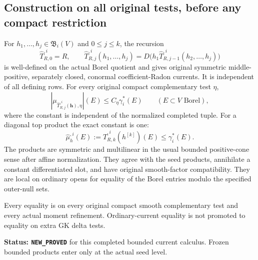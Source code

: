 \subsection{Construction on all original tests, before any compact restriction}

\begin{theorem}
\label{thm:r12-completed-band-products}
For $h_1,\ldots,h_j\in\mathfrak B_i(V)$ and $0\leq j\leq k$,
the recursion
\[
 \widehat T^{,i}_{R,0}=R,\qquad
 \widehat T^{,i}_{R,j}(h_1,\ldots,h_j)
    =D\bigl(h_1\widehat T^{,i}_{R,j-1}(h_2,\ldots,h_j)\bigr)
 \tag{BC4}
\]
is well-defined on the actual Borel quotient and gives original
symmetric middle-positive, separately closed, conormal
coefficient-Radon currents. It is independent of all defining
rows. For every original compact complementary test $\eta$,
\[
 \left|\mu_{\widehat T^{,i}_{R,j}(\mathbf h),\eta}\right|(E)
                \leq C_\eta\gamma_i^*(E)
                         \qquad(E\subset V\text{ Borel}),
 \tag{BC5}
\]
where the constant is independent of the normalized completed
tuple. For a diagonal top product the exact constant is one:
\[
       \widehat\mu^{,i}_h(E)
           :=\widehat T^{,i}_{R,k}(h^{[k]})(E)
                          \leq\gamma_i^*(E).
 \tag{BC6}
\]
The products are symmetric and multilinear in the usual bounded
positive-cone sense after affine normalization. They agree with
the seed products, annihilate a constant differentiated slot,
and have original smooth-factor compatibility. They are local
on ordinary opens for equality of the Borel entries modulo the
specified outer-null sets.

Every equality is on every original compact smooth complementary
test and every actual moment refinement. Ordinary-current
equality is not promoted to equality on extra GK delta tests.
\end{theorem}

\noindent\textbf{Status: \texttt{NEW\_PROVED}} for this completed
bounded current calculus. Frozen bounded products enter only at
the actual seed level.

